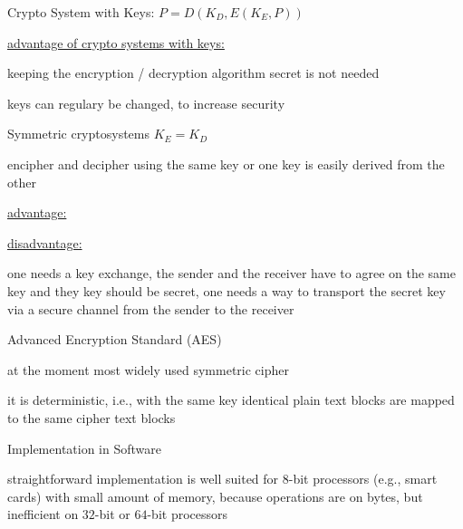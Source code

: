 \documentclass[landscape, a4paper]{article}
\begin{document}
\begin{minipage}[t]{0.19\pagewidth}
	\begin{betterlist}
		\item \alert{Crypto System with Keys:} $P = D(K_D, E(K_E, P))$
		\begin{betterlist}
			\item \underline{advantage of crypto systems with keys:}
			\begin{betterlist}
				\item keeping the encryption / decryption algorithm secret is not needed
				\item keys can regulary be changed, to increase security
			\end{betterlist}
		\end{betterlist}
	\end{betterlist}
	\begin{betterlist}
		\item \alert{Symmetric cryptosystems} $K_E = K_D$
		\begin{betterlist}
      \item encipher and decipher using the same key or one key is easily derived from the other
			\item \underline{advantage:}
			\item \underline{disadvantage:}
			\begin{betterlist}
				\item one needs a \alert{key exchange}, the sender and the receiver have to agree on the same key and they key should be secret, one needs a way to transport the secret key via a secure channel from the sender to the receiver
			\end{betterlist}
		\end{betterlist}
		\begin{betterlist}
			\item Advanced Encryption Standard (AES)
			\begin{betterlist}
				\item at the moment most widely used symmetric cipher
				\item it is \alert{deterministic}, i.e., with the same key identical plain text blocks are mapped to the same cipher text blocks
			\end{betterlist}
			\begin{betterlist}
				\item Implementation in Software
				\begin{betterlist}
					\item straightforward implementation is well suited for $8$-bit processors (e.g., smart cards) with small amount of memory, because operations are on bytes, but inefficient on $32$-bit or $64$-bit processors

\end{betterlist}
\end{betterlist}
\end{betterlist}
\end{betterlist}
\end{minipage}
\end{document}
